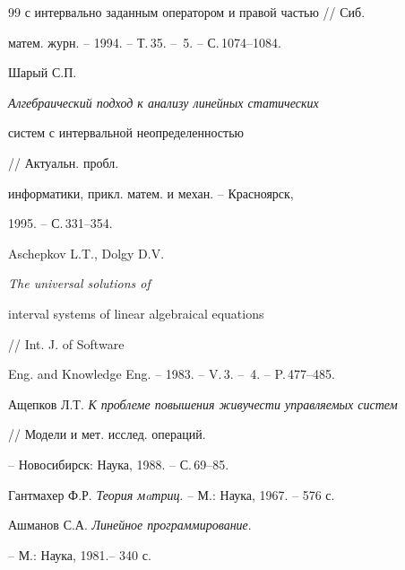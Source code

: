 \begin{thebibliography}{99}
{с интервально заданным оператором и правой частью} // Сиб. 


матем. журн. -- 1994. -- Т.\,35. -- \No\,5. -- С.\,1074--1084. 




Шарый С.П. {\em Алгебраический подход к анализу линейных статических 


систем с интервальной неопределенностью} // Актуальн. пробл. 


информатики, прикл. матем. и механ. -- Красноярск, 


1995. -- С.\,331--354. 




Aschepkov L.T., Dolgy D.V. {\em The universal solutions of 


interval systems of linear algebraical equations} // Int. J. of Software 


Eng. and Knowledge Eng. -- 1983. -- V.\,3. -- \No\,4. -- P.\,477--485. 




Ащепков Л.Т. {\em К проблеме повышения живучести управляемых систем} 


// Модели и мет. исслед. операций. 


-- Новосибирск: Наука, 1988. -- С.\,69--85. 




Гантмахер Ф.Р. {\em Теория мaтриц}. -- М.: Наука, 1967. -- 576 с. 




Ашманов С.А. {\em Линейное программирование}. 


-- М.: Наука, 1981.-- 340 с. 


 


\end{thebibliography} 


 


\vskip 2cm 


 






 


\label{end} 


 


